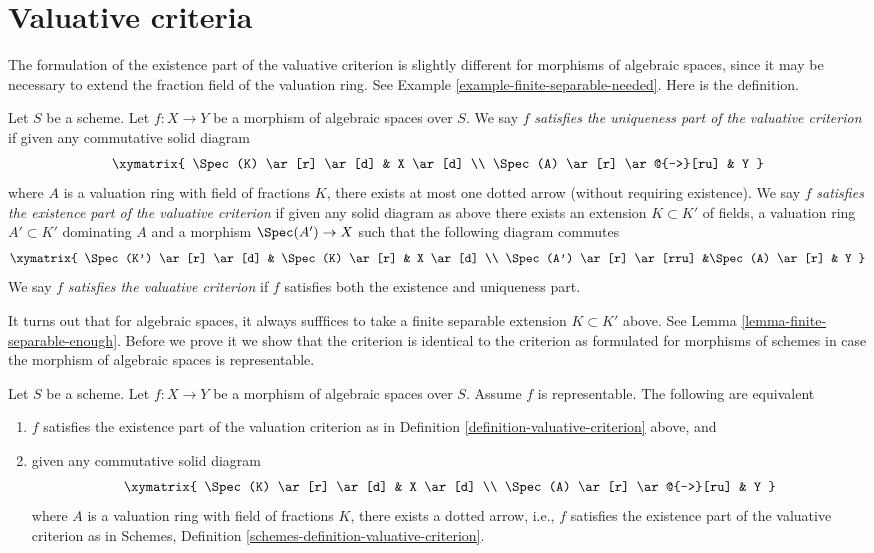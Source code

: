 \section{Valuative criteria}
\label{section-valuative}

\noindent
The formulation of the existence part of the valuative criterion is
slightly different for morphisms of algebraic spaces, since it may be
necessary to extend the fraction field of the valuation ring.
See Example \ref{example-finite-separable-needed}. Here is the definition.

\begin{definition}
\label{definition-valuative-criterion}
Let $S$ be a scheme.
Let $f : X \to Y$ be a morphism of algebraic spaces over $S$.
We say $f$ {\it satisfies the uniqueness part of the valuative criterion}
if given any commutative solid diagram
$$
\xymatrix{
\Spec(K) \ar[r] \ar[d] & X \ar[d] \\
\Spec(A) \ar[r] \ar@{-->}[ru] & Y
}
$$
where $A$ is a valuation ring with field of fractions $K$, there exists
at most one dotted arrow (without requiring existence).
We say $f$ {\it satisfies the existence part of the valuative criterion}
if given any solid diagram as above there exists an extension
$K \subset K'$ of fields, a valuation ring $A' \subset K'$ dominating
$A$ and a morphism $\Spec(A') \to X$ such that the following
diagram commutes
$$
\xymatrix{
\Spec(K') \ar[r] \ar[d] & \Spec(K) \ar[r] & X \ar[d] \\
\Spec(A') \ar[r] \ar[rru] &\Spec(A) \ar[r] & Y
}
$$
We say $f$ {\it satisfies the valuative criterion}
if $f$ satisfies both the existence and uniqueness part.
\end{definition}

\noindent
It turns out that for algebraic spaces, it always sufffices to
take a finite separable extension $K \subset K'$ above.
See Lemma \ref{lemma-finite-separable-enough}.
Before we prove it we show that the criterion
is identical to the criterion as formulated for morphisms of schemes
in case the morphism of algebraic spaces is representable.

\begin{lemma}
\label{lemma-valuative-criterion-representable}
Let $S$ be a scheme.
Let $f : X \to Y$ be a morphism of algebraic spaces over $S$.
Assume $f$ is representable. The following are equivalent
\begin{enumerate}
\item $f$ satisfies the existence part of the valuation criterion
as in Definition \ref{definition-valuative-criterion} above, and
\item given any commutative solid diagram
$$
\xymatrix{
\Spec(K) \ar[r] \ar[d] & X \ar[d] \\
\Spec(A) \ar[r] \ar@{-->}[ru] & Y
}
$$
where $A$ is a valuation ring with field of fractions $K$, there exists
a dotted arrow, i.e., $f$ satisfies the existence part of the valuative
criterion as in
Schemes, Definition \ref{schemes-definition-valuative-criterion}.
\end{enumerate}
\end{lemma}

